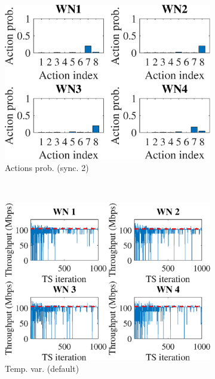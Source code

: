 \documentclass[preprint,12pt]{article}
\begin{document}
\begin{figure}[h!]
\begin{subfigure}[b]{.3\textwidth}
		\includegraphics[width=\textwidth]{images/actions_probability_CTS}
		\caption{Actions prob. (sync. 2)}\label{fig:actions_probability_CTS}
	\end{subfigure}\\
	\begin{subfigure}[b]{.3\textwidth}
		\includegraphics[width=\textwidth]{images/temporal_individual_tpt_TS}
		\caption{Temp. var.  (default)}\label{fig:temporal_individual_tpt_TS}
	\end{subfigure}
	\begin{subfigure}[b]{.3\textwidth}

\end{subfigure}
\end{figure}
\end{document}
